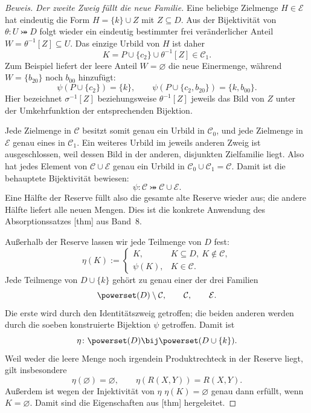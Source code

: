 \begin{proof}[Beweis]
\emph{Der zweite Zweig füllt die neue Familie.}
Eine beliebige Zielmenge \(H\in\mathcal E\) hat eindeutig die Form
\(H=\{k\}\cup Z\) mit \(Z\subseteq D\).
Aus der Bijektivität von \(\theta\colon U\bij D\) folgt wieder
ein eindeutig bestimmter frei veränderlicher Anteil
\(W=\theta^{-1}[Z]\subseteq U\). Das einzige Urbild von \(H\) ist daher
\[
  K=P\cup\{c_2\}\cup\theta^{-1}[Z]\in\mathcal C_1.
\]
Zum Beispiel liefert der leere Anteil \(W=\varnothing\) die neue
Einermenge, während \(W=\{b_{20}\}\) noch \(b_{00}\) hinzufügt:
\[
  \psi(P\cup\{c_2\})=\{k\},\qquad
  \psi(P\cup\{c_2,b_{20}\})=\{k,b_{00}\}.
\]
Hier bezeichnet \(\sigma^{-1}[Z]\) beziehungsweise
\(\theta^{-1}[Z]\) jeweils das Bild von \(Z\) unter der
Umkehrfunktion der entsprechenden Bijektion.

Jede Zielmenge in \(\mathcal C\) besitzt somit genau ein Urbild
in \(\mathcal C_0\), und jede Zielmenge in \(\mathcal E\)
genau eines in \(\mathcal C_1\). Ein weiteres Urbild im jeweils
anderen Zweig ist ausgeschlossen, weil dessen Bild in der anderen,
disjunkten Zielfamilie liegt. Also hat jedes Element von
\(\mathcal C\cup\mathcal E\) genau ein Urbild in
\(\mathcal C_0\cup\mathcal C_1=\mathcal C\).
Damit ist die behauptete Bijektivität bewiesen:
\[
  \psi\colon\mathcal C\bij\mathcal C\cup\mathcal E.
\]
Eine Hälfte der Reserve füllt also die gesamte alte Reserve wieder
aus; die andere Hälfte liefert alle neuen Mengen. Dies ist die
konkrete Anwendung des Absorptionssatzes
[thm] aus Band~8.

Außerhalb der Reserve lassen wir jede Teilmenge von \(D\) fest:
\[
  \eta(K):=
    \begin{cases}
      K,&K\subseteq D,\ K\notin\mathcal C,\\
      \psi(K),&K\in\mathcal C.
    \end{cases}
\]
Jede Teilmenge von \(D\cup\{k\}\) gehört zu genau einer der
drei Familien
\[
  \powerset(D)\setminus\mathcal C,\qquad
  \mathcal C,\qquad\mathcal E.
\]
Die erste wird durch den Identitätszweig getroffen; die beiden anderen
werden durch die soeben konstruierte Bijektion \(\psi\) getroffen.
Damit ist
\[
  \eta\colon\powerset(D)\bij\powerset(D\cup\{k\}).
\]
Weil weder die leere Menge noch irgendein Produktrechteck in der
Reserve liegt, gilt insbesondere
\begin{equation}
  \eta(\varnothing)=\varnothing,
  \qquad \eta(R(X,Y))=R(X,Y).
  \tag{***}\label{mog-reading-fixed-rectangles}
\end{equation}
Außerdem ist wegen der Injektivität von \(\eta\)
\(\eta(K)=\varnothing\) genau dann erfüllt, wenn
\(K=\varnothing\). Damit sind die Eigenschaften aus
[thm] hergeleitet.


\end{proof}
